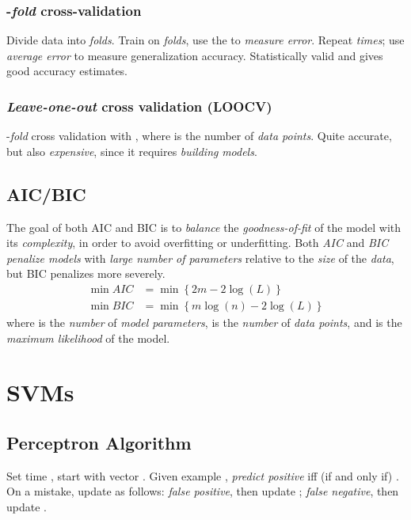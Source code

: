 \documentclass[
	exam={Midterm}
]{cs584exam}
\begin{document}
\subsection{-\emph{fold} cross-validation}\label{subsec:k-fold-cross-validation}
Divide data into  \emph{folds}.
Train on  \emph{folds}, use the  to \emph{measure error}.
Repeat  \emph{times}; use \emph{average error} to measure generalization accuracy.
Statistically valid and gives good accuracy estimates.

\subsection{\emph{Leave-one-out} cross validation (LOOCV)}\label{subsec:loocv}
-\emph{fold} cross validation with , where  is the number of \emph{data points}.
Quite accurate, but also \emph{expensive}, since it requires \emph{building}  \emph{models}.

\section{AIC/BIC}\label{sec:aic/bic}
The goal of both AIC and BIC is to \emph{balance} the \emph{goodness-of-fit} of the model with its \emph{complexity}, in order to avoid overfitting or underfitting.
Both \emph{AIC} and \emph{BIC} \emph{penalize models} with \emph{large number of parameters} relative to the \emph{size} of the \emph{data}, but BIC penalizes more severely.
\begin{equation}
	\begin{aligned}
		\min AIC &= \min\left\{ 2m - 2\log(L) \right\}\\
		\min BIC &= \min\left\{ m\log(n) - 2\log(L) \right\}
	\end{aligned}\label{eq:aic-bic}
\end{equation}
where  is the \emph{number} of \emph{model parameters},  is the \emph{number} of \emph{data points}, and  is the \emph{maximum likelihood} of the model.

\chapter{SVMs}\label{ch:svms}
\section{Perceptron Algorithm}\label{sec:perceptron-algorithm}
Set time , start with vector .
Given example , \emph{predict positive} iff (if and only if) .
On a mistake, update as follows:
\emph{false positive}, then update ;
\emph{false negative}, then update .
\end{document}
